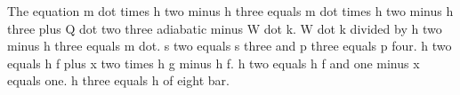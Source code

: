 The equation m dot times h two minus h three equals m dot times h two minus h three plus Q dot two three adiabatic minus W dot k.  
W dot k divided by h two minus h three equals m dot.  
s two equals s three and p three equals p four.  
h two equals h f plus x two times h g minus h f.  
h two equals h f and one minus x equals one.  
h three equals h of eight bar.